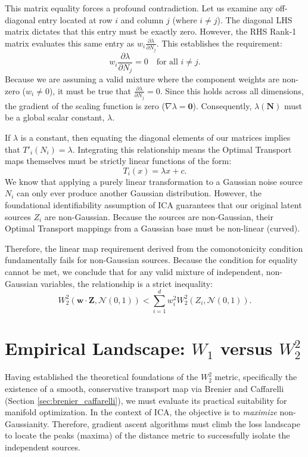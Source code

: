 \documentclass[12pt,a4paper,twoside,openany]{book}
\begin{document}
This matrix equality forces a profound contradiction. Let us examine any off-diagonal entry located at row $i$ and column $j$ (where $i \neq j$). 
The diagonal LHS matrix dictates that this entry must be exactly zero. However, the RHS Rank-1 matrix evaluates this same entry as $w_i \frac{\partial \lambda}{\partial N_j}$. 
This establishes the requirement:
\begin{equation}
    w_i \frac{\partial \lambda}{\partial N_j} = 0 \quad \text{for all } i \neq j.
\end{equation}
Because we are assuming a valid mixture where the component weights are non-zero ($w_i \neq 0$), it must be true that $\frac{\partial \lambda}{\partial N_j} = 0$. 
Since this holds across all dimensions, the gradient of the scaling function is zero ($\nabla \lambda = \mathbf{0}$). 
Consequently, $\lambda(\mathbf{N})$ must be a global scalar constant, $\lambda$.

If $\lambda$ is a constant, then equating the diagonal elements of our matrices implies that $T'_i(N_i) = \lambda$. Integrating this relationship means the 
Optimal Transport maps themselves must be strictly linear functions of the form:
\begin{equation}
    T_i(x) = \lambda x + c.
\end{equation}
We know that applying a purely linear transformation to a Gaussian noise source $N_i$ can only ever produce another Gaussian distribution. 
However, the foundational identifiability assumption of ICA guarantees that our original latent sources $Z_i$ are non-Gaussian. Because the sources are non-Gaussian, 
their Optimal Transport mappings from a Gaussian base must be non-linear (curved). 

Therefore, the linear map requirement derived from the comonotonicity condition fundamentally fails for non-Gaussian sources. 
Because the condition for equality cannot be met, we conclude that for any valid mixture of independent, non-Gaussian variables, the relationship is a strict inequality:
\begin{equation}
    W_2^2(\mathbf{w} \cdot \mathbf{Z}, \mathcal{N}(0,1)) < \sum_{i=1}^d w_i^2 W_2^2(Z_i, \mathcal{N}(0,1)).
\end{equation}

\section{Empirical Landscape: $W_1$ versus $W_2^2$}
Having established the theoretical foundations of the $W_2^2$ metric, specifically the existence of a smooth, conservative transport map via Brenier and Caffarelli (Section \ref{sec:brenier_caffarelli}), 
we must evaluate its practical suitability for manifold optimization. In the context of ICA, the objective is to \textit{maximize} non-Gaussianity. 
Therefore, gradient ascent algorithms must climb the loss landscape to locate the peaks (maxima) of the distance metric to successfully isolate the independent sources.
\end{document}
